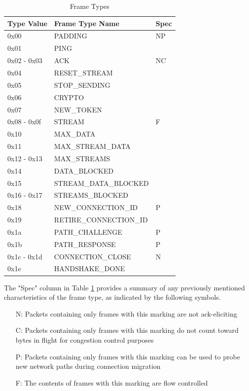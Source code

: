 \begin{table}[H]
\begin{center}
    \begin{tabular}{| l | l | l |}
    \hline
    \textbf{Type Value} & \textbf{Frame Type Name}  & \textbf{Spec} \\ \hline
    0x00 & PADDING & NP \\ \hline
    0x01 & PING  &  \\ \hline
    0x02 - 0x03 & ACK & NC \\ \hline
    0x04 & RESET\_STREAM &  \\ \hline
    0x05 & STOP\_SENDING &  \\ \hline
    0x06 & CRYPTO &  \\ \hline
    0x07 & NEW\_TOKEN &  \\ \hline
    0x08 - 0x0f & STREAM & F \\ \hline
    0x10 & MAX\_DATA &  \\ \hline
    0x11 & MAX\_STREAM\_DATA &  \\ \hline
    0x12 - 0x13 & MAX\_STREAMS &  \\ \hline
    0x14 & DATA\_BLOCKED &  \\ \hline
    0x15 & STREAM\_DATA\_BLOCKED &  \\ \hline
    0x16 - 0x17 & STREAMS\_BLOCKED &  \\ \hline
    0x18 & NEW\_CONNECTION\_ID & P \\ \hline
    0x19 & RETIRE\_CONNECTION\_ID &  \\ \hline
    0x1a & PATH\_CHALLENGE & P \\ \hline
    0x1b & PATH\_RESPONSE & P \\ \hline
    0x1c - 0x1d & CONNECTION\_CLOSE & N \\ \hline
    0x1e & HANDSHAKE\_DONE &  \\ \hline
    \end{tabular}
\end{center}
\caption{Frame Types \cite[70 - 71]{rfc9000}}
\label{table_frame_types}
\end{table}
The "Spec" column in Table \ref{table_frame_types} provides a summary of any previously mentioned characteristics of the frame type, as indicated by the following symbols.
\begingroup
\renewcommand\labelenumi{(\theenumi)}
\begin{enumerate}
\item[N:] Packets containing only frames with this marking are not ack-eliciting \label{spec_n}
\item[C:] Packets containing only frames with this marking do not count toward bytes in flight for
congestion control purposes \label{spec_c}
\item[P:] Packets containing only frames with this marking can be used to probe new network paths
during connection migration \label{spec_p}
\item[F:] The contents of frames with this marking are flow controlled \label{spec_f}
\end{enumerate}
\endgroup

